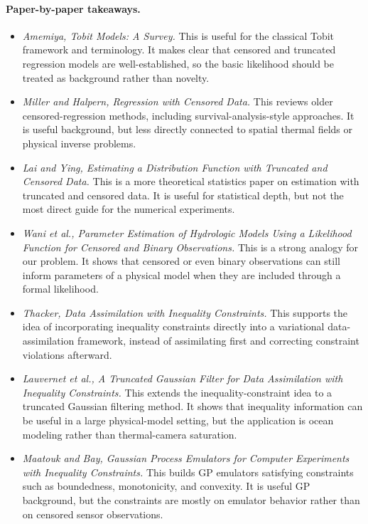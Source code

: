 \paragraph{Paper-by-paper takeaways.}
\begin{itemize}
    \item \textit{Amemiya, Tobit Models: A Survey.}
    This is useful for the classical Tobit framework and terminology. It makes clear that censored and truncated regression models are well-established, so the basic likelihood should be treated as background rather than novelty.

    \item \textit{Miller and Halpern, Regression with Censored Data.}
    This reviews older censored-regression methods, including survival-analysis-style approaches. It is useful background, but less directly connected to spatial thermal fields or physical inverse problems.

    \item \textit{Lai and Ying, Estimating a Distribution Function with Truncated and Censored Data.}
    This is a more theoretical statistics paper on estimation with truncated and censored data. It is useful for statistical depth, but not the most direct guide for the numerical experiments.

    \item \textit{Wani et al., Parameter Estimation of Hydrologic Models Using a Likelihood Function for Censored and Binary Observations.}
    This is a strong analogy for our problem. It shows that censored or even binary observations can still inform parameters of a physical model when they are included through a formal likelihood.

    \item \textit{Thacker, Data Assimilation with Inequality Constraints.}
    This supports the idea of incorporating inequality constraints directly into a variational data-assimilation framework, instead of assimilating first and correcting constraint violations afterward.

    \item \textit{Lauvernet et al., A Truncated Gaussian Filter for Data Assimilation with Inequality Constraints.}
    This extends the inequality-constraint idea to a truncated Gaussian filtering method. It shows that inequality information can be useful in a large physical-model setting, but the application is ocean modeling rather than thermal-camera saturation.

    \item \textit{Maatouk and Bay, Gaussian Process Emulators for Computer Experiments with Inequality Constraints.}
    This builds GP emulators satisfying constraints such as boundedness, monotonicity, and convexity. It is useful GP background, but the constraints are mostly on emulator behavior rather than on censored sensor observations.


\end{itemize}
